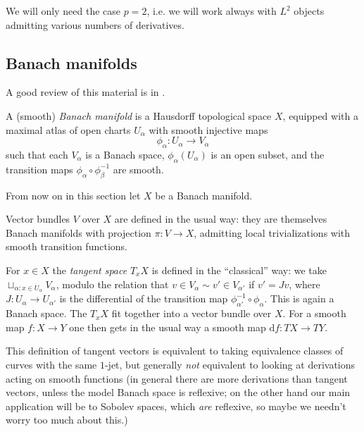 \documentclass[12pt,letterpaper,reqno]{article}
\numberwithin{equation}{section}
\newcommand{\de}{\mathrm{d}}
\newcommand{\ti}[1]{\textit{#1}}
\begin{document}
We will only need the case $p=2$, i.e. we will work always with 
$L^2$ objects admitting various numbers of derivatives.


\subsection{Banach manifolds}

A good review of this material is in \cite{MR0158410}.

\begin{defn} A (smooth) \ti{Banach manifold} is
a Hausdorff topological space $X$, equipped with a maximal
atlas of open charts $U_\alpha$ with smooth injective maps
\begin{equation}
  \phi_\alpha: U_\alpha \to V_\alpha
\end{equation}
such that each $V_\alpha$ is a Banach space, $\phi_\alpha(U_\alpha)$
is an open subset, and the transition maps $\phi_\alpha \circ \phi_\beta^{-1}$ 
are smooth.
\end{defn}

From now on in this section let $X$ be a Banach manifold.

\begin{defn} Vector bundles $V$ over $X$
are defined in the usual way: they are themselves Banach manifolds
with projection $\pi: V \to X$, admitting local trivializations with
smooth transition functions.
\end{defn}

\begin{defn} For $x \in X$ the \ti{tangent space} $T_x X$
is defined in the ``classical'' way: we take 
$\sqcup_{\alpha: x \in U_\alpha} V_\alpha$, modulo
the relation that $v \in V_\alpha \sim v' \in V_{\alpha'}$ if
$v' = Jv$, where $J: U_\alpha \to U_{\alpha'}$ is the differential
of the transition map $\phi_{\alpha'}^{-1} \circ \phi_\alpha$.
This is again a Banach space. The $T_x X$ fit together into a vector bundle
over $X$. For a smooth map $f: X \to Y$ one then gets in the usual 
way a smooth map $\de f: TX \to TY$.
\end{defn}

This definition of tangent vectors is equivalent to taking 
equivalence classes of curves with the same $1$-jet, 
but generally \ti{not} equivalent to looking at derivations acting on
smooth functions (in general there are more derivations
than tangent vectors, unless the model Banach space
is reflexive; on the other hand our main application will
be to Sobolev spaces, which \ti{are} reflexive, so maybe
we needn't worry too much about this.)
\end{document}

